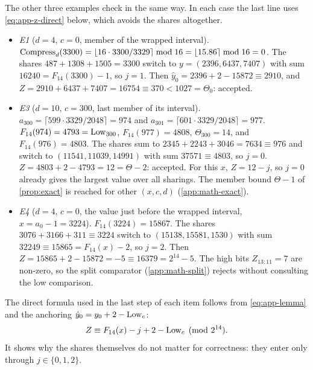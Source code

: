 The other three examples check in the same way. In each case the last line uses \cref{eq:app-z-direct} below, which avoids the shares altogether.
\begin{itemize}
  \item \emph{E1} ($d = 4$, $c = 0$, member of the wrapped interval). $\operatorname{Compress}_d(3300) = \lfloor 16 \cdot 3300/3329 \rceil \bmod 16 = \lfloor 15.86 \rceil \bmod 16 = 0$. The shares $487 + 1308 + 1505 = 3300$ switch to $y = (2396, 6437, 7407)$ with sum $16240 = F_{14}(3300) - 1$, so $j = 1$. Then $\hat y_0 = 2396 + 2 - 15872 \equiv 2910$, and $Z = 2910 + 6437 + 7407 = 16754 \equiv 370 < 1027 = \Theta_0$: accepted.
  \item \emph{E3} ($d = 10$, $c = 300$, last member of its interval). $a_{300} = \lceil 599 \cdot 3329/2048 \rceil = 974$ and $a_{301} = \lceil 601 \cdot 3329/2048 \rceil = 977$. $F_{14}(974) = 4793 = \mathrm{Low}_{300}$, $F_{14}(977) = 4808$, $\Theta_{300} = 14$, and $F_{14}(976) = 4803$. The shares sum to $2345 + 2243 + 3046 = 7634 \equiv 976$ and switch to $(11541, 11039, 14991)$ with sum $37571 \equiv 4803$, so $j = 0$. $Z = 4803 + 2 - 4793 = 12 = \Theta - 2$: accepted. For this $x$, $Z = 12 - j$, so $j = 0$ already gives the largest value over all sharings. The member bound $\Theta - 1$ of \cref{prop:exact} is reached for other $(x, c, d)$ (\cref{app:math-exact}).
  \item \emph{E4} ($d = 4$, $c = 0$, the value just before the wrapped interval, $x = a_0 - 1 = 3224$). $F_{14}(3224) = 15867$. The shares $3076 + 3166 + 311 \equiv 3224$ switch to $(15138, 15581, 1530)$ with sum $32249 \equiv 15865 = F_{14}(x) - 2$, so $j = 2$. Then $Z = 15865 + 2 - 15872 = -5 \equiv 16379 = 2^{14} - 5$. The high bits $Z_{13:11} = 7$ are non-zero, so the split comparator (\cref{app:math-split}) rejects without consulting the low comparison.
\end{itemize}
The direct formula used in the last step of each item follows from \cref{eq:app-lemma} and the anchoring $\hat y_0 = y_0 + 2 - \mathrm{Low}_c$:
\begin{equation}
  Z \equiv F_{14}(x) - j + 2 - \mathrm{Low}_c \pmod{2^{14}} .\label{eq:app-z-direct}
\end{equation}
It shows why the shares themselves do not matter for correctness: they enter only through $j \in \{0, 1, 2\}$.


